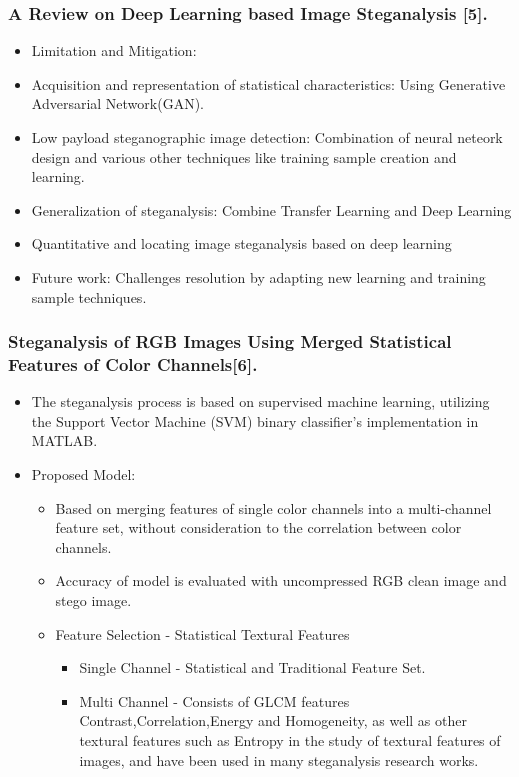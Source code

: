 \documentclass{beamer} %
\theoremstyle{definition} %
\begin{document}
\begin{frame}
\frametitle{A Review on Deep Learning based Image Steganalysis [5]. }
\begin{itemize}
	\item{Limitation and Mitigation:}
\end{itemize}
	\begin{itemize}
		\item {Acquisition and representation of statistical characteristics: Using  Generative Adversarial Network(GAN).}
		\item {Low payload steganographic image detection: Combination of neural neteork design and various other techniques like training sample creation and learning.}
		\item {Generalization of steganalysis: Combine Transfer Learning and Deep Learning}
		\item {Quantitative and locating image steganalysis based on
			deep learning }
	\end{itemize}
\begin{itemize}
	\item{Future work: Challenges resolution by adapting new learning and training sample techniques.}
\end{itemize}
\end{frame}

\begin{frame}
\frametitle{Steganalysis of RGB Images Using Merged Statistical Features of Color Channels[6].}
\begin{itemize}
	\item The steganalysis process is based on supervised machine learning, utilizing the Support Vector Machine (SVM) binary classifier’s implementation in MATLAB.
	\item Proposed Model:
	\begin{itemize}
        \item{Based on merging features of single color channels into a multi-channel feature set, without consideration to the correlation between color channels.}
        \item{Accuracy of model is evaluated with uncompressed RGB clean image and stego image.}
     \item Feature Selection - Statistical Textural Features
     \begin{itemize}
     	\item Single Channel - Statistical and Traditional Feature Set.
     	\item Multi Channel -  Consists of GLCM features Contrast,Correlation,Energy and Homogeneity, as well as other textural features such as Entropy in the study of textural features of images, and have been used in many steganalysis research works.
     \end{itemize}
	\end{itemize}
\end{itemize}
\end{frame}
\end{document}

